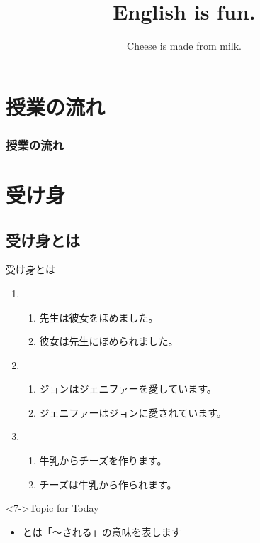 \documentclass[aspectratio=169,xcolor={dvipsnames,table}]{beamer}
\title{English is fun.}
\subtitle{Cheese is made from milk.}
\author{}
\institute[]{}
\date[]
\begin{document}
\begin{frame}[plain]
  \titlepage
\end{frame}

\section*{授業の流れ}
\begin{frame}[plain]
  \frametitle{授業の流れ}
  \tableofcontents
\end{frame}

\section{受け身}

\subsection{受け身とは}

\begin{frame}[plain]{受け身とは}
 \Large

\begin{enumerate}
 \item<1-> \begin{enumerate}
	\item<1-> 先生は彼女をほめました。
	\item<2-> 彼女は先生にほめられました。
       \end{enumerate}
 \item<3-> \begin{enumerate}
	\item<3-> ジョンはジェニファーを愛しています。
	\item<4-> ジェニファーはジョンに愛されています。
       \end{enumerate}
 \item<5-> \begin{enumerate}
	\item<5-> 牛乳からチーズを作ります。
	\item<6-> チーズは牛乳から作られます。
       \end{enumerate}
\end{enumerate}

\begin{exampleblock}<7->{Topic for Today}
\begin{itemize}[square]\small
 \item {}とは「〜される」の意味を表します
\end{itemize}
     \end{exampleblock}

\end{frame}
\end{document}
